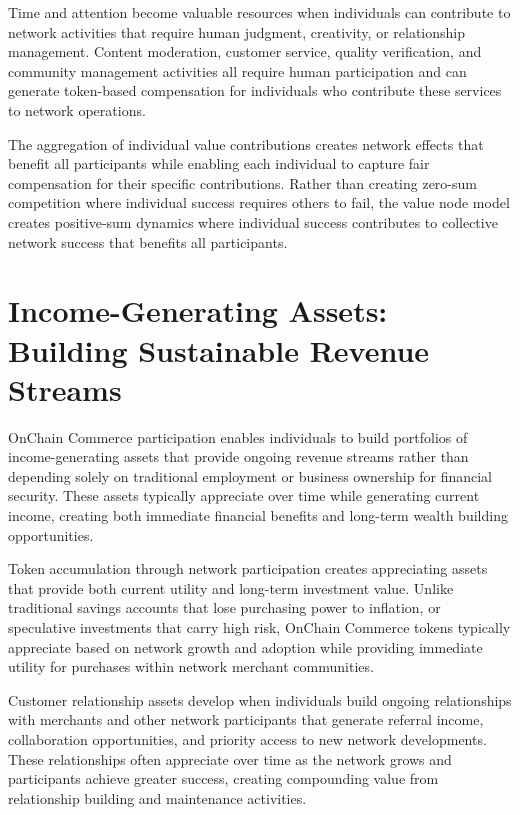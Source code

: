 \documentclass[
  Letterpaper,
]{scrbook}
\begin{document}
Time and attention become valuable resources when individuals can
contribute to network activities that require human judgment,
creativity, or relationship management. Content moderation, customer
service, quality verification, and community management activities all
require human participation and can generate token-based compensation
for individuals who contribute these services to network operations.

The aggregation of individual value contributions creates network
effects that benefit all participants while enabling each individual to
capture fair compensation for their specific contributions. Rather than
creating zero-sum competition where individual success requires others
to fail, the value node model creates positive-sum dynamics where
individual success contributes to collective network success that
benefits all participants.

\section{Income-Generating Assets: Building Sustainable Revenue
Streams}\label{income-generating-assets-building-sustainable-revenue-streams}

OnChain Commerce participation enables individuals to build portfolios
of income-generating assets that provide ongoing revenue streams rather
than depending solely on traditional employment or business ownership
for financial security. These assets typically appreciate over time
while generating current income, creating both immediate financial
benefits and long-term wealth building opportunities.

Token accumulation through network participation creates appreciating
assets that provide both current utility and long-term investment value.
Unlike traditional savings accounts that lose purchasing power to
inflation, or speculative investments that carry high risk, OnChain
Commerce tokens typically appreciate based on network growth and
adoption while providing immediate utility for purchases within network
merchant communities.

Customer relationship assets develop when individuals build ongoing
relationships with merchants and other network participants that
generate referral income, collaboration opportunities, and priority
access to new network developments. These relationships often appreciate
over time as the network grows and participants achieve greater success,
creating compounding value from relationship building and maintenance
activities.
\end{document}
